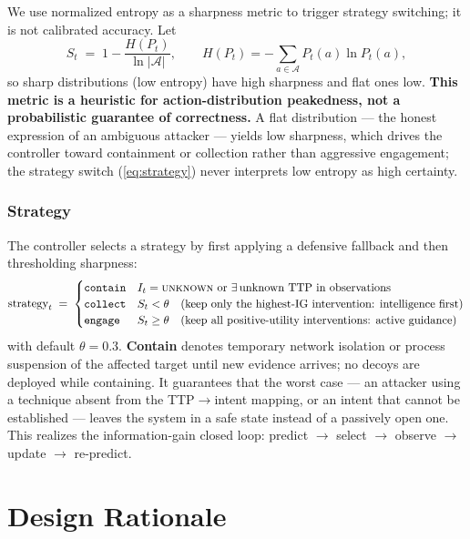 \documentclass[preprints,article,accept,oneauthor]{Definitions/mdpi}
\newcommand{\act}[1]{\texttt{#1}}
\newcommand{\intent}[1]{\textsc{#1}}
\begin{document}
We use normalized entropy as a sharpness metric to trigger strategy
switching; it is not calibrated accuracy. Let
\begin{equation}
\label{eq:sharpness}
S_t \;=\; 1 - \frac{H(P_t)}{\ln |\mathcal{A}|},
\qquad
H(P_t) = -\sum_{a \in \mathcal{A}} P_t(a) \ln P_t(a),
\end{equation}
so sharp distributions (low entropy) have high sharpness and flat ones low.
\textbf{This metric is a heuristic for action-distribution peakedness, not a
probabilistic guarantee of correctness.} A flat distribution --- the honest
expression of an ambiguous attacker --- yields low sharpness, which drives
the controller toward containment or collection rather than aggressive
engagement; the strategy switch (\ref{eq:strategy}) never interprets low
entropy as high certainty.

\subsubsection{Strategy}
\label{sec:strategy}

The controller selects a strategy by first applying a defensive fallback
and then thresholding sharpness:
\begin{equation}
\label{eq:strategy}
\text{strategy}_t \;=\;
\begin{cases}
\act{contain} & I_t = \intent{unknown} \text{ or } \exists\, \text{unknown
TTP in observations} \\
\act{collect} & S_t < \theta \quad\text{(keep only the highest-IG
intervention: intelligence first)} \\
\act{engage} & S_t \geq \theta \quad\text{(keep all positive-utility
interventions: active guidance)}
\end{cases}
\end{equation}
with default $\theta = 0.3$. \textbf{Contain} denotes temporary network
isolation or process suspension of the affected target until new evidence
arrives; no decoys are deployed while containing. It guarantees that the
worst case --- an attacker using a technique absent from the TTP$\to$intent
mapping, or an intent that cannot be established --- leaves the system in a
safe state instead of a passively open one. This realizes the
information-gain closed loop: predict $\to$ select $\to$ observe $\to$
update $\to$ re-predict.

\section{Design Rationale}
\label{sec:rationale}
\end{document}

